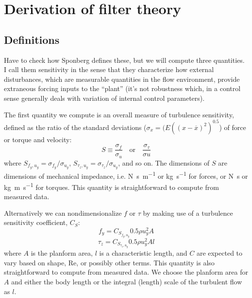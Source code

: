 \documentclass{jfm}
\begin{document}
\appendix
\section{Derivation of filter theory}
\label{app}

\subsection{Definitions}
Have to check how Sponberg defines these, but we will compute three quantities.  I call them sensitivity in the sense that they characterize how external disturbances, which are measurable quantities in the flow environment, provide extraneous forcing inputs to the ``plant'' (it's not robustness which, in a control sense generally deals with variation of internal control parameters). 

The first quantity we compute is an overall measure of turbulence sensitivity, defined as the ratio of the standard deviations ($\sigma_x = (E((x-\overline{x})^2)^{0.5}$) of force or torque and velocity: 
\begin{equation}
S %
\equiv 
\frac{\sigma_f } %
{\sigma_u } %
\quad\mbox{or}\quad
\frac{\sigma_\tau}
{\sigma u}
\end{equation}
where $S_{f_y,u_y}=\sigma_{f_y}/\sigma_{u_y}$, $S_{\tau_z,u_y}=\sigma_{\tau_z}/\sigma_{u_y}$, and so on. The dimensions of $S$ are dimensions of mechanical impedance, i.e. \si{\newton\second\per\meter} or \si{\kilo\gram\per\second} for forces, or \si{\newton\second} or \si{\kilo\gram\meter\per\second} for torques. This quantity is straightforward to compute from measured data. 

Alternatively we can nondimensionalize $f$ or $\tau$ by making use of a turbulence sensitivity coefficient, $C_S$: 
\begin{equation}
f_y = C_{S_{f_y,u_y}} 0.5 \rho u_y^2 A
\end{equation}
\begin{equation}
\tau_z = C_{S_{\tau_z,u_y}} 0.5 \rho u_y^2 A l
\end{equation}
where $A$ is the planform area, $l$ is a characteristic length, and $C$ are expected to vary based on shape, $\mbox{Re}$, or possibly other terms. This quantity is also straightforward to compute from measured data.  We choose the planform area for $A$ and either the body length or the integral (length) scale of the turbulent flow as $l$.  
\end{document}
